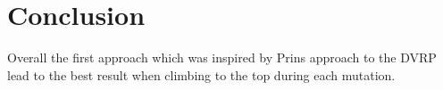 
\section{Conclusion}
Overall the first approach which was inspired by Prins \cite{prins2004simple} approach to the DVRP lead to the best result when climbing to the top during each mutation.


